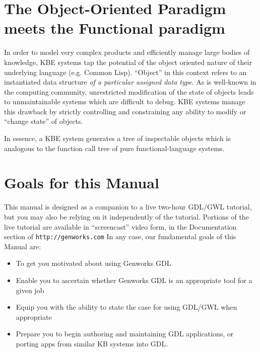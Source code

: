 \documentclass [11pt]{book}
\begin{document}
\section{The Object-Oriented Paradigm meets the Functional paradigm}

\label{sec:theobject-orientedparadigmmeetsthefunctionalparadigm}

In order to model very complex products and efficiently manage
large bodies of knowledge, KBE systems tap the potential of the object
oriented nature of their underlying language (e.g. Common
Lisp). ``Object'' in this context refers to an instantiated data
structure \emph{of a particular assigned data type}. As is well-known in the computing community, unrestricted
modification of the state of objects leads to unmaintainable systems
which are difficult to debug. KBE systems manage this drawback by
strictly controlling and constraining any ability to modify or
``change state'' of objects.

In essence, a KBE system generates a tree of inspectable objects which
is analogous to the function call tree of pure functional-language
systems.

\section{Goals for this Manual}

\label{sec:goalsforthismanual}

This manual is designed as a companion to a live two-hour
GDL/GWL tutorial, but you may also be relying on it independently of
the tutorial. Portions of the live tutorial are available in
``screencast'' video form, in the Documentation section of \texttt{http://genworks.com} In any case, our fundamental goals of this Manual are:

\begin{itemize}

\item To get you motivated about using Genworks GDL

\item Enable you to ascertain whether Genworks GDL is an appropriate tool for a given job

\item Equip you with the ability to state the case for using GDL/GWL when appropriate

\item Prepare you to begin authoring and maintaining GDL
applications, or porting apps from similar KB systems into GDL.

\end{itemize}
\end{document}

